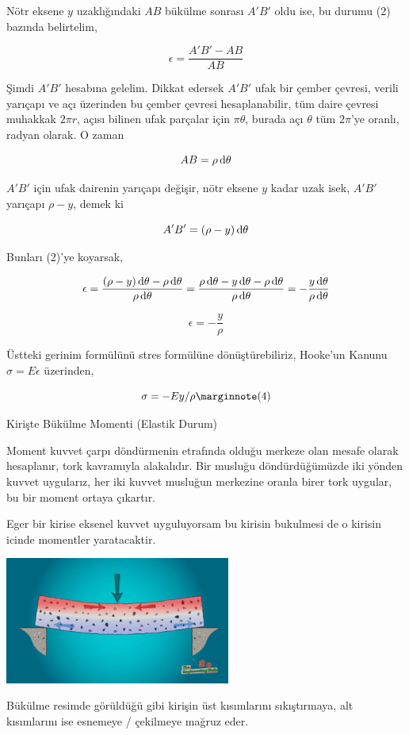 \documentclass[12pt,fleqn]{article}\usepackage{../../common}
\begin{document}
Nötr eksene $y$ uzaklığındaki $AB$ bükülme sonrası $A'B'$ oldu ise, bu durumu
(2) bazında belirtelim,

$$
\epsilon = \frac{A'B' - AB}{AB}
$$

Şimdi $A'B'$ hesabına gelelim. Dikkat edersek $A'B'$ ufak bir çember çevresi,
verili yarıçapı ve açı üzerinden bu çember çevresi hesaplanabilir, tüm daire
çevresi muhakkak $2 \pi r$, açısı bilinen ufak parçalar için $\pi \theta$,
burada açı $\theta$ tüm $2 \pi$'ye oranlı, radyan olarak. O zaman

$$
AB = \rho \,\mathrm{d} \theta
$$

$A'B'$ için ufak dairenin yarıçapı değişir, nötr eksene $y$ kadar uzak isek,
$A'B'$ yarıçapı $\rho - y$, demek ki 

$$
A'B' = (\rho - y) \,\mathrm{d} \theta
$$

Bunları (2)'ye koyarsak,

$$
\epsilon = \frac{(\rho - y) \,\mathrm{d} \theta - \rho \,\mathrm{d} \theta}{\rho \,\mathrm{d}\theta} =
\frac{\rho \,\mathrm{d}\theta - y \,\mathrm{d}\theta - \rho \,\mathrm{d}\theta}{\rho \,\mathrm{d}\theta} =
- \frac{y \,\mathrm{d}\theta}{\rho \,\mathrm{d}\theta}
$$

$$
\epsilon = - \frac{y}{\rho}
$$

Üstteki gerinim formülünü stres formülüne dönüştürebiliriz, Hooke'un Kanunu
$\sigma = E \epsilon$ üzerinden,

$$
\sigma = -E y / \rho
\mlabel{4}
$$

Kirişte Bükülme Momenti (Elastik Durum)

Moment kuvvet çarpı döndürmenin etrafında olduğu merkeze olan mesafe olarak
hesaplanır, tork kavramıyla alakalıdır. Bir musluğu döndürdüğümüzde iki yönden
kuvvet uygularız, her iki kuvvet musluğun merkezine oranla birer tork uygular,
bu bir moment ortaya çıkartır.

Eger bir kirise eksenel kuvvet uyguluyorsam bu kirisin bukulmesi de o kirisin
icinde momentler yaratacaktir. 

\includegraphics[width=20em]{phy_020_strs_01_06.jpg}

Bükülme resimde görüldüğü gibi kirişin üst kısımlarını sıkıştırmaya, alt
kısımlarını ise esnemeye / çekilmeye mağruz eder. 
\end{document}
